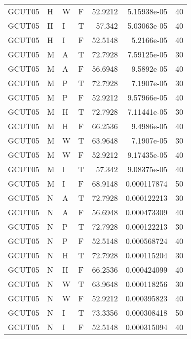 \begin{table}[htb!]
{\begin{tabular}{llllrrr}
            GCUT05   & H     & W     & F          & 52.9212    & 5.15938e-05 & 40       \\
            GCUT05   & H     & I     & T          & 57.342     & 5.03063e-05 & 40       \\
            GCUT05   & H     & I     & F          & 52.5148    & 5.2166e-05  & 40       \\
            GCUT05   & M     & A     & T          & 72.7928    & 7.59125e-05 & 30       \\
            GCUT05   & M     & A     & F          & 56.6948    & 9.5892e-05  & 40       \\
            GCUT05   & M     & P     & T          & 72.7928    & 7.1907e-05  & 30       \\
            GCUT05   & M     & P     & F          & 52.9212    & 9.57966e-05 & 40       \\
            GCUT05   & M     & H     & T          & 72.7928    & 7.11441e-05 & 30       \\
            GCUT05   & M     & H     & F          & 66.2536    & 9.4986e-05  & 40       \\
            GCUT05   & M     & W     & T          & 63.9648    & 7.1907e-05  & 30       \\
            GCUT05   & M     & W     & F          & 52.9212    & 9.17435e-05 & 40       \\
            GCUT05   & M     & I     & T          & 57.342     & 9.08375e-05 & 40       \\
            GCUT05   & M     & I     & F          & 68.9148    & 0.000117874 & 50       \\
            GCUT05   & N     & A     & T          & 72.7928    & 0.000122213 & 30       \\
            GCUT05   & N     & A     & F          & 56.6948    & 0.000473309 & 40       \\
            GCUT05   & N     & P     & T          & 72.7928    & 0.000122213 & 30       \\
            GCUT05   & N     & P     & F          & 52.5148    & 0.000568724 & 40       \\
            GCUT05   & N     & H     & T          & 72.7928    & 0.000115204 & 30       \\
            GCUT05   & N     & H     & F          & 66.2536    & 0.000424099 & 40       \\
            GCUT05   & N     & W     & T          & 63.9648    & 0.000118256 & 30       \\
            GCUT05   & N     & W     & F          & 52.9212    & 0.000395823 & 40       \\
            GCUT05   & N     & I     & T          & 73.3356    & 0.000308418 & 50       \\
            GCUT05   & N     & I     & F          & 52.5148    & 0.000315094 & 40       \\
            \hline
        \end{tabular}
    }{
    }
\end{table} 
